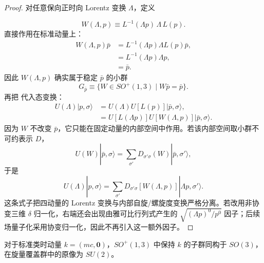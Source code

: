 \begin{proof}
对任意保向正时向 Lorentz 变换 $\Lambda$，定义

\begin{equation*}
 {
 W(\Lambda,p)
 \equiv L^{-1}(\Lambda p)\,\Lambda\,L(p).}
 \end{equation*}
直接作用在标准动量上：
\begin{align*}
 W(\Lambda,p)\bar p
 &=L^{-1}(\Lambda p)\Lambda L(p)\bar p,\\
 &=L^{-1}(\Lambda p)\Lambda p,\\
 &=\bar p.
 \end{align*}
因此 $W(\Lambda,p)$ 确实属于稳定 $\bar p$ 的小群
\begin{equation*}
 G_{\bar p}\equiv\{W\in SO^+(1,3)\mid W\bar p=\bar p\}.
 \end{equation*}
再把  代入态变换：
\begin{align*}
 U(\Lambda)|p,\sigma\rangle
 &=U(\Lambda)U[L(p)]|\bar p,\sigma\rangle,\\
 &=U[L(\Lambda p)]U[W(\Lambda,p)]|\bar p,\sigma\rangle.
\end{align*}
因为 $W$ 不改变 $\bar p$，它只能在固定动量的内部空间中作用。若该内部空间取小群不可约表示 $D$，
\begin{equation*}
 U(W)|\bar p,\sigma\rangle
 =\sum_{\sigma'}D_{\sigma'\sigma}(W)|\bar p,\sigma'\rangle,
\end{equation*}
于是
\begin{equation*}
 {
 U(\Lambda)|p,\sigma\rangle
 =\sum_{\sigma'}
 D_{\sigma'\sigma}[W(\Lambda,p)]
 |\Lambda p,\sigma'\rangle.}
 \end{equation*}
这条式子把四动量的 Lorentz 变换与内部自旋/螺旋度变换严格分离。若改用非协变三维 $\delta$ 归一化，右端还会出现由雅可比行列式产生的 $\sqrt{(\Lambda p)^0/p^0}$ 因子；后续场量子化采用协变归一化，因此不再引入这一额外因子。
\end{proof}

\begin{theorem}[有质量小群]
对于标准类时动量 $k=(mc,\mathbf0)$，$SO^+(1,3)$ 中保持 $k$ 的子群同构于 $SO(3)$，在旋量覆盖群中的原像为 $SU(2)$。
\end{theorem}

